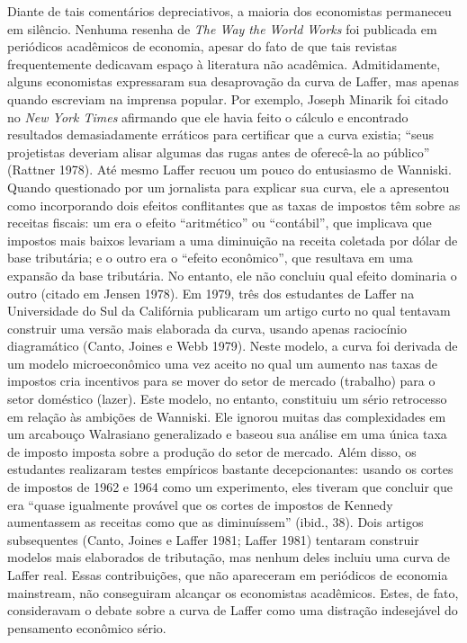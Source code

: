 \documentclass[12pt]{article}
\begin{document}
Diante de tais comentários depreciativos, a maioria dos economistas permaneceu em silêncio. Nenhuma resenha de \textit{The Way the World Works} foi publicada em periódicos acadêmicos de economia, apesar do fato de que tais revistas frequentemente dedicavam espaço à literatura não acadêmica. Admitidamente, alguns economistas expressaram sua desaprovação da curva de Laffer, mas apenas quando escreviam na imprensa popular. Por exemplo, Joseph Minarik foi citado no \textit{New York Times} afirmando que ele havia feito o cálculo e encontrado resultados demasiadamente erráticos para certificar que a curva existia; ``seus projetistas deveriam alisar algumas das rugas antes de oferecê-la ao público'' (Rattner 1978). Até mesmo Laffer recuou um pouco do entusiasmo de Wanniski. Quando questionado por um jornalista para explicar sua curva, ele a apresentou como incorporando dois efeitos conflitantes que as taxas de impostos têm sobre as receitas fiscais: um era o efeito ``aritmético'' ou ``contábil'', que implicava que impostos mais baixos levariam a uma diminuição na receita coletada por dólar de base tributária; e o outro era o ``efeito econômico'', que resultava em uma expansão da base tributária. No entanto, ele não concluiu qual efeito dominaria o outro (citado em Jensen 1978). Em 1979, três dos estudantes de Laffer na Universidade do Sul da Califórnia publicaram um artigo curto no qual tentavam construir uma versão mais elaborada da curva, usando apenas raciocínio diagramático (Canto, Joines e Webb 1979). Neste modelo, a curva foi derivada de um modelo microeconômico uma vez aceito no qual um aumento nas taxas de impostos cria incentivos para se mover do setor de mercado (trabalho) para o setor doméstico (lazer). Este modelo, no entanto, constituiu um sério retrocesso em relação às ambições de Wanniski. Ele ignorou muitas das complexidades em um arcabouço Walrasiano generalizado e baseou sua análise em uma única taxa de imposto imposta sobre a produção do setor de mercado. Além disso, os estudantes realizaram testes empíricos bastante decepcionantes: usando os cortes de impostos de 1962 e 1964 como um experimento, eles tiveram que concluir que era ``quase igualmente provável que os cortes de impostos de Kennedy aumentassem as receitas como que as diminuíssem'' (ibid., 38). Dois artigos subsequentes (Canto, Joines e Laffer 1981; Laffer 1981) tentaram construir modelos mais elaborados de tributação, mas nenhum deles incluiu uma curva de Laffer real. Essas contribuições, que não apareceram em periódicos de economia mainstream, não conseguiram alcançar os economistas acadêmicos. Estes, de fato, consideravam o debate sobre a curva de Laffer como uma distração indesejável do pensamento econômico sério.
\end{document}
